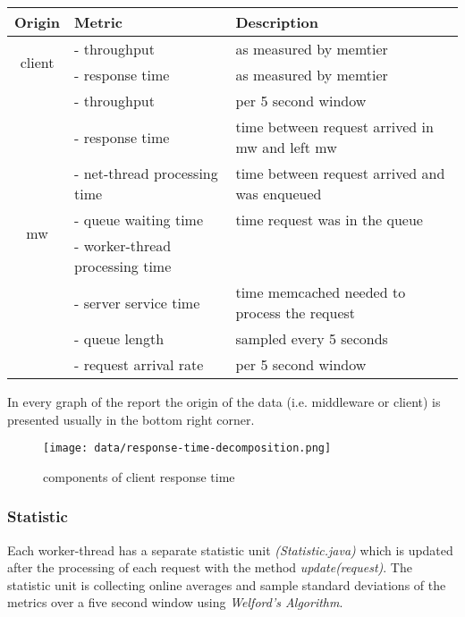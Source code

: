 \documentclass[report.tex]{subfiles}
\begin{document}
\begin{tabular}{|c|l|l|}
	\hline 
	\textbf{Origin} & \textbf{Metric} & \textbf{Description} \Tstrut \\ 
	\hline 
	\multirow{2}{*}{client} & - throughput & as measured by memtier \Tstrut \\ 
	& - response time & as measured by memtier \\ 
	\hline 
	\multirow{8}{*}{mw} & - throughput & per 5 second window \Tstrut \\ 
	& - response time & time between request arrived in mw and left mw\\ 
	& - net-thread processing time & time between request arrived and was enqueued\\  
	& - queue waiting time & time request was in the queue \\ 
	& - worker-thread processing time &  \\ 
	& - server service time & time memcached needed to process the request\\  
	& - queue length & sampled every 5 seconds \\  
	& - request arrival rate & per 5 second window \\ 
	\hline 
\end{tabular} 

In every graph of the report the origin of the data (i.e. middleware or client) is presented usually in the bottom right corner.


\begin{figure}
	\centering
	\texttt{[image: data/response-time-decomposition.png]}
	\caption{components of client response time}
\end{figure}

\subsubsection{Statistic}

Each worker-thread has a separate statistic unit \emph{(Statistic.java)} which is updated after the processing of each request with the method \emph{update(request)}.  
The statistic unit is collecting online averages and sample standard deviations of the metrics over a five second window using \emph{Welford's Algorithm}.\cite{Knuth:1997:ACP:270146}

\end{document}
